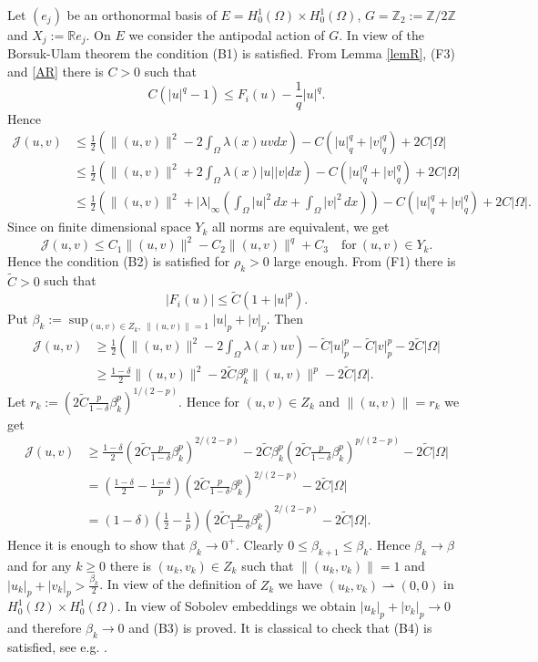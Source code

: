 \documentclass{scrartcl}
\newcommand{\cJ}{{\mathcal J}}
\newcommand{\weakto}{\rightharpoonup}
\numberwithin{equation}{section}
\begin{document}
Let $(e_j)$ be an orthonormal basis of $E = H^1_0 (\Omega) \times H^1_0 (\Omega)$, $G = \mathbb{Z}_2 := \mathbb{Z}/2\mathbb{Z}$ and $X_j := \mathbb{R}e_j$. On $E$ we consider the antipodal action of $G$. In view of the Borsuk-Ulam theorem the condition (B1) is satisfied. From Lemma \ref{lemR}, (F3) and \eqref{AR} there is $C > 0$ such that
$$
C ( |u|^q - 1) \leq F_i(u) - \frac{1}{q} |u|^q.
$$
Hence
\begin{align*}
\cJ (u,v) &\leq \frac{1}{2} \left( \|(u,v)\|^2 - 2 \int_\Omega \lambda(x) uv dx \right) - C (|u|_q^q+|v|_q^q) + 2C | \Omega| \\ 
&\leq \frac{1}{2} \left( \|(u,v)\|^2 + 2 \int_\Omega \lambda(x) |u| |v| dx \right) - C (|u|_q^q+|v|_q^q) + 2C | \Omega| \\
&\leq \frac{1}{2} \left( \|(u,v)\|^2 + |\lambda|_\infty \left( \int_\Omega |u|^2 \, dx + \int_\Omega |v|^2 \, dx \right) \right) - C (|u|_q^q+|v|_q^q) + 2C | \Omega|. 
\end{align*}
Since on finite dimensional space $Y_k$ all norms are equivalent, we get
$$
\cJ(u,v) \leq C_1 \|(u,v)\|^2 - C_2 \| (u,v)\|^q + C_3 \quad \mathrm{for} \ (u,v) \in Y_k.
$$
Hence the condition (B2) is satisfied for $\rho_k > 0$ large enough.
From (F1) there is $\tilde{C} > 0$ such that
$$
|F_i(u)| \leq \tilde{C} (1 + |u|^p).
$$
Put $\beta_k := \sup_{(u,v) \in Z_k, \ \|(u,v)\|=1} |u|_p + |v|_p$. Then
\begin{align*}
\cJ(u,v) &\geq \frac{1}{2} \left( \|(u,v)\|^2 - 2 \int_\Omega \lambda(x) uv \right) - \tilde{C} |u|_p^p - \tilde{C} |v|_p^p - 2 \tilde{C} |\Omega| \\
&\geq \frac{1-\delta}{2} \|(u,v)\|^2 - 2\tilde{C} \beta_k^p \|(u,v)\|^p - 2 \tilde{C} |\Omega|.
\end{align*}
Let $r_k := (2 \tilde{C} \frac{p}{1-\delta} \beta_k^p )^{1/(2-p)}$. Hence for $(u,v) \in Z_k$ and $\|(u,v)\| = r_k$ we get
\begin{align*}
\cJ(u,v) &\geq \frac{1-\delta}{2} \left(2 \tilde{C} \frac{p}{1-\delta} \beta_k^p \right)^{2/(2-p)} - 2 \tilde{C} \beta_k^p \left(2 \tilde{C} \frac{p}{1-\delta} \beta_k^p \right)^{p/(2-p)} - 2 \tilde{C} |\Omega| \\
&= \left( \frac{1-\delta}{2} -\frac{1-\delta}{ p } \right) \left(2 \tilde{C} \frac{p}{1-\delta} \beta_k^p \right)^{2/(2-p)}  - 2 \tilde{C} |\Omega| \\
&= (1-\delta) \left( \frac{1}{2} -\frac{1}{ p } \right) \left(2 \tilde{C} \frac{p}{1-\delta} \beta_k^p \right)^{2/(2-p)}  - 2 \tilde{C} |\Omega|.
\end{align*}
Hence it is enough to show that $\beta_k \to 0^+$. Clearly $0 \leq \beta_{k+1} \leq \beta_k$. Hence $\beta_k \to \beta$ and for any $k \geq 0$ there is $(u_k,v_k) \in Z_k$ such that $\|(u_k,v_k)\| = 1$ and $|u_k|_p + |v_k|_p > \frac{\beta_k}{2}$. In view of the definition of $Z_k$ we have $(u_k,v_k) \weakto (0,0)$ in $H^1_0 (\Omega) \times H^1_0 (\Omega)$. In view of Sobolev embeddings we obtain $|u_k|_p + |v_k|_p \to 0$ and therefore $\beta_k \to 0$ and (B3) is proved. It is classical to check that (B4) is satisfied, see e.g. \cite[Lemma 2.17]{Willem}.
\end{document}
